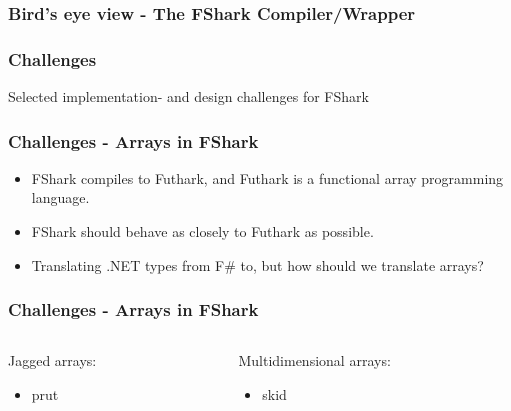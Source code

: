\documentclass[10pt, compress, usenames, dvipsnames]{beamer}
\begin{document}
\begin{frame}[fragile]
  \frametitle{Bird's eye view - The FShark Compiler/Wrapper}

\end{frame}
\begin{frame}[plain]
  \frametitle{Challenges}
\begin{center}
  \Huge Selected implementation- and design challenges for FShark
\end{center}

\end{frame}

\begin{frame}[plain]
\frametitle{Challenges - Arrays in FShark}
\begin{itemize}
\item<1-> FShark compiles to Futhark, and Futhark is a functional array programming
language.
\item<2-> FShark should behave as closely to Futhark as possible.
\item<3-> Translating .NET types from F\# to, but how should we translate arrays?
\end{itemize}

\end{frame}

\begin{frame}[plain]
\frametitle{Challenges - Arrays in FShark}
\begin{columns}
  \begin{column}{.48\textwidth}
    Jagged arrays:
    \begin{itemize}
    \item<1-> {\color{red}prut}
    \end{itemize}
  \end{column}
  \begin{column}{.48\textwidth}
    Multidimensional arrays:
    \begin{itemize}
    \item<1-> {\color{green(ryb)}skid}
    \end{itemize}
  \end{column}
\end{columns}

\end{frame}
\end{document}
